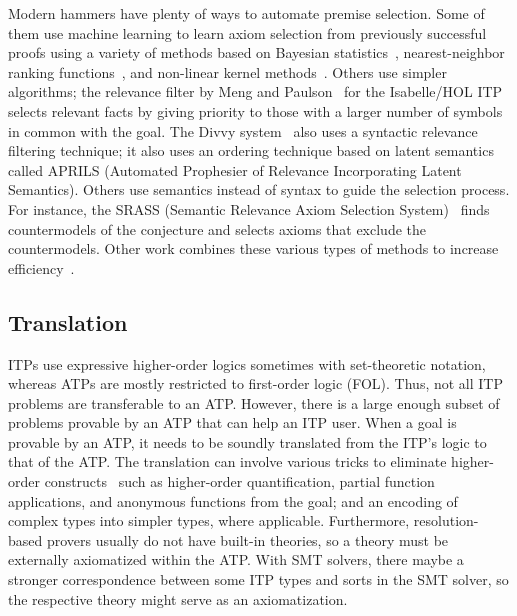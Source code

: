 \documentclass{article}
\begin{document}
		Modern hammers have plenty of ways to 
		automate premise selection. Some of them use 
		machine learning to learn axiom selection from 
		previously successful proofs using 
		a variety of methods based on Bayesian 
		statistics~\cite{DBLP:journals/jar/AlamaHKTU14}, 
		nearest-neighbor ranking 
		functions~\cite{DBLP:conf/cade/KaliszykU13a}, and
		non-linear kernel
		methods~\cite{DBLP:journals/jar/AlamaHKTU14}.
		Others use simpler algorithms; the relevance filter 
		by Meng and Paulson~\cite{DBLP:journals/japll/MengP09}
		for the Isabelle/HOL ITP selects relevant facts by 
		giving priority to those with a larger number of 
		symbols in common with the goal. The Divvy 
		system~\cite{10.1007/978-3-642-02959-2_13} also 
		uses a syntactic relevance filtering technique; 
		it also uses an ordering technique based 
		on latent semantics called APRILS (Automated 
		Prophesier of Relevance Incorporating Latent 
		Semantics). Others use semantics instead of 
		syntax to guide	the selection process. For 
		instance, the SRASS (Semantic Relevance Axiom 
		Selection 
		System)~\cite{10.1007/978-3-540-73595-3_20} 
		finds countermodels of the conjecture and selects 
		axioms that	exclude the countermodels. Other work combines these various types of methods to increase efficiency~\cite{DBLP:journals/corr/KaliszykU13b, 
		10.1007/978-3-642-31365-3_30}.
		
		\subsection{Translation}
		ITPs use expressive higher-order logics
		sometimes with set-theoretic notation, whereas 
		ATPs are mostly restricted to first-order logic 
		(FOL). Thus, not all ITP problems are transferable 
		to an ATP. However, there is a large enough subset 
		of problems provable by an ATP that can help an 
		ITP user. When a goal is provable by an ATP, it 
		needs to be soundly translated from the ITP's 
		logic to that of the ATP. The translation can 
		involve various tricks to eliminate higher-order 
		constructs~\cite{DBLP:journals/jar/MengP08} 
		such as higher-order quantification, partial 
		function applications, and anonymous functions
		from the goal; and an encoding of complex 
		types into simpler types, where applicable.
		Furthermore, resolution-based 
		provers usually do not have built-in theories, so a 
		theory must be externally axiomatized within the 
		ATP. With SMT solvers, there maybe a stronger
		correspondence between some ITP types and 
		sorts in the SMT solver, so the respective 
		theory might serve as an axiomatization.
\end{document}
